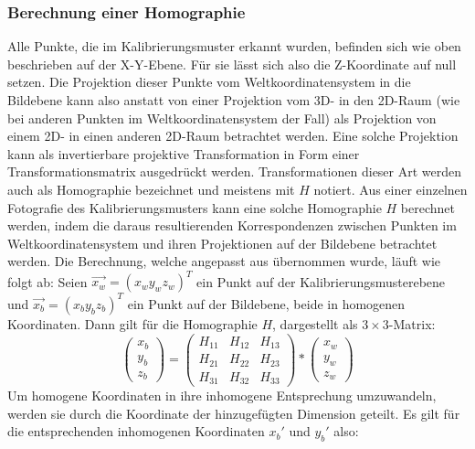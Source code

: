 \newpage

\subsubsection{Berechnung einer Homographie}
Alle Punkte, die im Kalibrierungsmuster erkannt wurden, befinden sich wie oben beschrieben auf der X-Y-Ebene. Für sie lässt sich also die Z-Koordinate auf null setzen. Die Projektion dieser Punkte vom Weltkoordinatensystem in die Bildebene kann also anstatt von einer Projektion vom 3D- in den 2D-Raum (wie bei anderen Punkten im Weltkoordinatensystem der Fall) als Projektion von einem 2D- in einen anderen 2D-Raum betrachtet werden. Eine solche Projektion kann als invertierbare projektive Transformation in Form einer Transformationsmatrix ausgedrückt werden. Transformationen dieser Art werden auch als Homographie bezeichnet und meistens mit \(H\) notiert. Aus einer einzelnen Fotografie des Kalibrierungsmusters kann eine solche Homographie \(H\) berechnet werden, indem die daraus resultierenden Korrespondenzen zwischen Punkten im Weltkoordinatensystem und ihren Projektionen auf der Bildebene betrachtet werden. Die Berechnung, welche angepasst aus \cite{Kriegman:07} übernommen wurde, läuft wie folgt ab:
\newline
Seien \(\vec{x_w} = \left(x_w y_w z_w\right)^{T}\) ein Punkt auf der Kalibrierungsmusterebene und \(\vec{x_b} = \left(x_b y_b z_b\right)^{T}\) ein Punkt auf der Bildebene, beide in homogenen Koordinaten. Dann gilt für die Homographie \(H\), dargestellt als \(3\times 3\)-Matrix:
\begin{equation}
\label{equ:homographie1}
	\left(\begin{array}{c}x_b\\y_b\\z_b\end{array}\right) =  \begin{pmatrix}
			H_{11} & H_{12} & H_{13} \\
			H_{21} & H_{22} & H_{23} \\
			H_{31} & H_{32} & H_{33}
		\end{pmatrix} * \left(\begin{array}{c}x_w\\y_w\\z_w\end{array}\right)
\end{equation}
Um homogene Koordinaten in ihre inhomogene Entsprechung umzuwandeln, werden sie durch die Koordinate der hinzugefügten Dimension geteilt. Es gilt für die entsprechenden inhomogenen Koordinaten \(x_b\prime\) und \(y_b\prime\) also:
